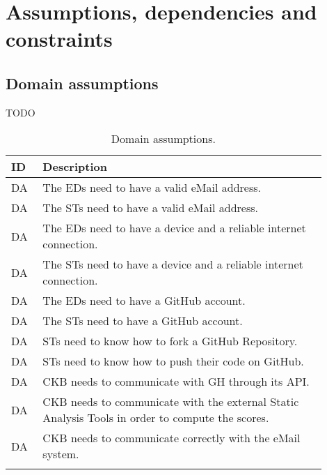 \section{Assumptions, dependencies and constraints}
\label{sec:assumptions_dependencies_constraints}%

\subsection{Domain assumptions}
\label{subsec:domain_assumptions}%
TODO
\setcounter{da}{1}
\newcommand{\cda}{\theda\stepcounter{da}}
\begin{center}
    \begin{longtable}{ |l|p{0.9\linewidth}| }
        \hline
        \textbf{ID} & \textbf{Description} \\
        \hline
        DA\cda      & The EDs need to have a valid eMail address. \\
        \hline
        DA\cda      & The STs need to have a valid eMail address. \\
        \hline
        DA\cda      & The EDs need to have a device and a reliable internet connection. \\
        \hline
        DA\cda      & The STs need to have a device and a reliable internet connection. \\
        \hline
        DA\cda      & The EDs need to have a GitHub account. \\
        \hline
        DA\cda      & The STs need to have a GitHub account. \\
        \hline
        DA\cda      & STs need to know how to fork a GitHub Repository. \\
        \hline
        DA\cda      & STs need to know how to push their code on GitHub. \\
        \hline
        DA\cda      & CKB needs to communicate with GH through its API. \\
        \hline
        DA\cda      & CKB needs to communicate with the external Static Analysis Tools in order to compute the scores. \\
        \hline
        DA\cda      & CKB needs to communicate correctly with the eMail system. \\
        \hline
        \caption{Domain assumptions.}
        \label{tab:domainassmptn_tab}%
    \end{longtable}
\end{center}


